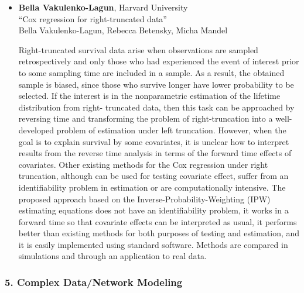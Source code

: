 \begin{itemize}
\item \textbf{Bella Vakulenko-Lagun}, Harvard University \\
``Cox regression for right-truncated data'' \\
Bella Vakulenko-Lagun, Rebecca Betensky, Micha Mandel


Right-truncated survival data arise when observations are sampled retrospectively and
only those who had experienced the event of interest prior to some sampling time are
included in a sample. As a result, the obtained sample is biased, since those who survive
longer have lower probability to be selected.
If the interest is in the nonparametric estimation of the lifetime distribution from right-
truncated data, then this task can be approached by reversing time and transforming the
problem of right-truncation into a well-developed problem of estimation under left truncation. However, when the goal is to explain survival by some covariates, it is unclear how
to interpret results from the reverse time analysis in terms of the forward time effects of
covariates. Other existing methods for the Cox regression under right truncation, although
can be used for testing covariate effect, suffer from an identifiability problem in estimation
or are computationally intensive.
The proposed approach based on the Inverse-Probability-Weighting (IPW) estimating
equations does not have an identifiability problem, it works in a forward time so that covariate effects can be interpreted as usual, it performs better than existing methods for both purposes of testing and estimation, and it is easily implemented using standard software.
Methods are compared in simulations and through an application to real data.

\end{itemize}

\subsubsection*{5. Complex Data/Network Modeling}

